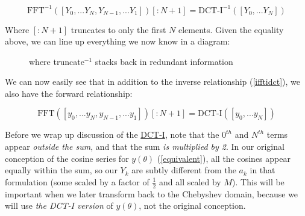 \documentclass[10pt]{article}
\begin{document}
\begin{equation}\label{ifftidct}
\text{FFT}^{-1}([Y_0, ... Y_N, Y_{N-1}, ... Y_1])[:N+1] = \text{DCT-I}^{-1}([Y_0, ... Y_N])
\end{equation}

Where $[:N+1]$ truncates to only the first $N$ elements. Given the equality above, we can line up everything we now know in a diagram:

\begin{figure}[h!]
\begin{center}
\begin{minipage}{0.5\textwidth}
\centering
{}
\end{minipage}
\begin{minipage}{0.25\textwidth} where truncate$^{-1}$ stacks back in redundant information\end{minipage}
\end{center}
\end{figure}

We can now easily see that in addition to the inverse relationship (\autoref{ifftidct}), we also have the forward relationship:

$$\text{FFT}([y_0, ... y_N, y_{N-1}, ... y_1])[:N+1] = \text{DCT-I}([y_0, ... y_N])$$

Before we wrap up discussion of the \href{https://docs.scipy.org/doc/scipy/reference/generated/scipy.fft.dct.html}{DCT-I}\cite{dct}, note that the $0^{th}$ and $N^{th}$ terms appear \textit{outside the sum}, and that the sum \textit{is multiplied by 2}. In our original conception of the cosine series for $y(\theta)$ (\autoref{equivalent}), all the cosines appear equally within the sum, so our $Y_k$ are subtly different from the $a_k$ in that formulation (some scaled by a factor of $\frac{1}{2}$ and all scaled by $M$). This will be important when we later transform back to the Chebyshev domain, because we will use \textit{the DCT-I version} of $y(\theta)$, not the original conception.
\end{document}
